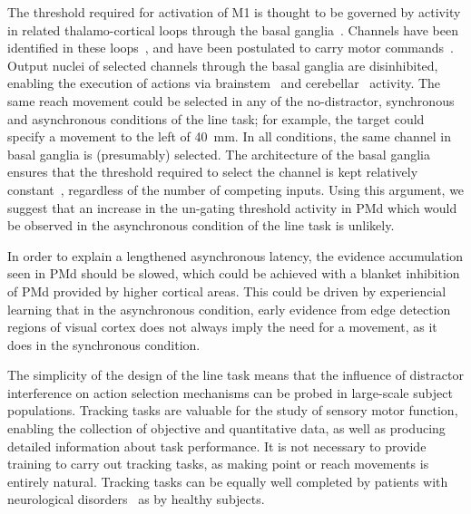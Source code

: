 \documentclass[10pt,letterpaper]{article}
\begin{document}
The threshold required for activation of M1 is thought to be governed
by activity in related thalamo-cortical loops through the basal
ganglia~\cite{parent_functional_1995,humphries_role_2002}. Channels
have been identified in these loops~\cite{zarzecki_distribution_1991},
and have been postulated to carry motor
commands~\cite{graybiel_basal_1994,doya_complementary_2000,middleton_basal_2000}.
Output nuclei of selected channels through the basal ganglia are
disinhibited, enabling the execution of actions via
brainstem~\cite{roseberry_cell-type-specific_2016} and
cerebellar~\cite{fortier_cerebellar_1989} activity. The same reach
movement could be selected in any of the no-distractor, synchronous
and asynchronous conditions of the line task; for example, the target
could specify a movement to the left of 40~mm. In all conditions, the
same channel in basal ganglia is (presumably) selected. The
architecture of the basal ganglia ensures that the threshold required
to select the channel is kept relatively
constant~\cite{gurney_computational_2001,bogacz_basal_2007},
regardless of the number of competing inputs. Using this argument, we
suggest that an increase in the un-gating threshold activity in PMd
which would be observed in the asynchronous condition of the line task
is unlikely.

In order to explain a lengthened asynchronous latency, the evidence
accumulation seen in PMd should be slowed, which could be achieved
with a blanket inhibition of PMd provided by higher cortical areas.
This could be driven by experiencial learning that in the asynchronous
condition, early evidence from edge detection regions of visual cortex
does not always imply the need for a movement, as it does in the
synchronous condition.
%


%

The simplicity of the design of the line task means that the influence
of distractor interference on action selection mechanisms can be
probed in large-scale subject populations.  Tracking tasks are
valuable for the study of sensory motor function, enabling the
collection of objective and quantitative data, as well as producing
detailed information about task performance. It is not necessary to
provide training to carry out tracking tasks, as making point or reach
movements is entirely natural. Tracking tasks can be equally well
completed by patients with neurological
disorders~\cite{hocherman_recruitment_2004} as by healthy subjects.
\end{document}
